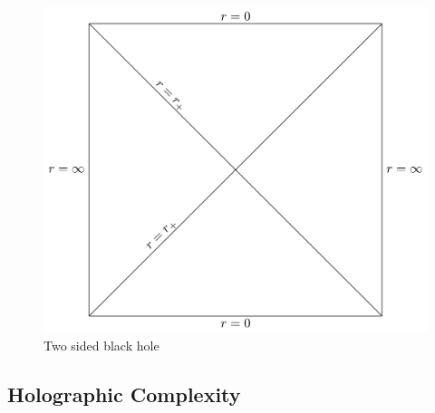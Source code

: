 \documentclass[8pt,aspectratio=169]{beamer}
\begin{document}
\begin{frame}
\begin{minipage}[t]{0.44\linewidth}
\begin{figure}
\begin{center}
        \includegraphics[scale=0.3]{2SidedBH}    
    
    \end{center}
    \caption{Two sided black hole}
    \label{fig:WDW}
\end{figure}

\end{minipage}

\end{frame}

\subsection{Holographic Complexity}
\end{document}
